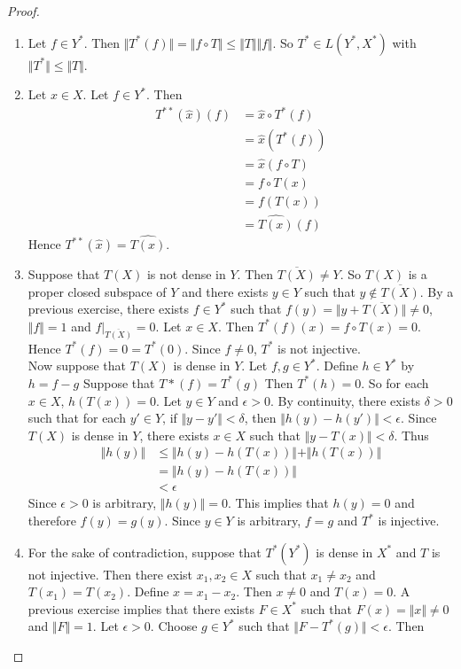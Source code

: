 \documentclass[12pt]{amsart}
\newcommand{\del}{\delta}
\newcommand{\ep}{\epsilon}
\newcommand{\n}{\Vert}
\begin{document}
\begin{proof}
\begin{enumerate}
\item Let $f \in Y^*$. Then $\n T^* (f) \n = \n f \circ T \n \leq  \n T \n  \n f \n$. So $T^* \in L(Y^*, X^*)$ with $\n T^* \n \leq \n T \n$.\vspace{.5cm}\\
\item Let $x \in X$. Let $f \in Y^*$. Then 
\begin{align*}
T^{**}(\hat{x})(f) 
&= \hat{x} \circ T^{*}(f) \\
&= \hat{x}(T^* (f)) \\
&= \hat{x}(f \circ T) \\
&= f \circ T (x) \\
&= f(T(x)) \\
&= \widehat{T(x)}(f)
\end{align*} 
Hence $T^{**}(\hat{x}) = \widehat{T(x)}$.\vspace{.5cm}\\
\item Suppose that $T(X)$ is not dense in $Y$. Then $\overline{T(X)} \neq Y$. So $T(X)$ is a proper closed subspace of $Y$ and there exists $y \in Y$ such that $y \not \in \overline{T(X)}$. By a previous exercise, there exists $f \in Y^*$ such that $f(y) = \n y+\overline{T(X)} \n \neq 0$, $\n f \n =1$ and $f|_{\overline{T(X)}} = 0$. Let $x \in X$. Then $T^*(f)(x) = f \circ T(x) = 0$. Hence $T^*(f) = 0 = T^*(0)$. Since $f \neq 0$, $T^*$ is not injective.\\ Now suppose that $T(X)$ is dense in $Y$. Let $f,g \in Y^*$. Define $h \in Y^*$ by $h = f-g$ Suppose that $T*(f) = T^*(g)$ Then $T^*(h) = 0$. So for each $x \in X$, $h(T(x)) = 0$. Let $y \in Y$ and $\ep >0$. By continuity, there exists $\del > 0 $ such that for each $y' \in Y$, if $\n y - y' \n < \del$, then $\n h(y) - h(y') \n < \ep$. Since $T(X)$ is dense in $Y$, there exists $x \in X$ such that $\n y - T(x) \n < \del$. Thus 
\begin{align*}
\n h (y) \n 
&\leq \n h(y) - h(T(x)) \n + \n h(T(x)) \n\\
& = \n h(y) - h(T(x)) \n  \\
& < \ep
\end{align*} 
Since $\ep > 0$ is arbitrary, $\n h(y) \n = 0$. This implies that $h(y) = 0$ and therefore $f(y) = g(y) $. Since $y \in Y$ is arbitrary, $f=g$ and $T^*$ is injective. \vspace{.5cm}\\
\item For the sake of contradiction, suppose that $T^*(Y^*)$ is dense in $X^*$ and $T$ is not injective. Then there exist $x_1, x_2 \in X$ such that $x_1 \neq x_2$ and $T(x_1) = T(x_2)$. Define $x = x_1-x_2$. Then $x \neq 0$ and $T(x) = 0$. A previous exercise implies that there exists $F \in X^*$ such that $F(x) = \n x\n \neq 0$ and $\n F \n = 1$. Let $\ep >0$. Choose $g \in Y^*$ such that $\n F - T^*(g) \n < \ep$. Then 

\end{enumerate}
\end{proof}
\end{document}
